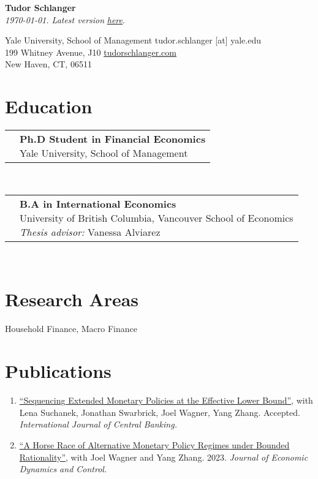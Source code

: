 \documentclass[letterpaper,10pt]{article}
\newcommand{\educItem}[4]{
		\vspace{0.2em} 	\begin{tabular*}{0.99\textwidth}[t]{lp{\labelsep}}
	      \eqparbox[t]{dates}{\ \ \ \ #1 \ \ \ \ } & \eqparbox[t]{educList}{\textbf{#2} \\ #3 \\ #4}
	   \end{tabular*} \vspace{0.2em} \\
		}
\newcommand{\pubSubHeadingListStart}{\begin{enumerate}[leftmargin=1em]}
\newcommand{\pubSubHeadingListEnd}{\end{enumerate}\vspace{-5pt}}
\newcommand{\pubItem}[3]{
	  \item{
	    \href{#1}{``#2''}{, with #3 \vspace{-2pt}}
	  }
	}
\begin{document}

\begin{center}
    \textbf{\Large  Tudor Schlanger} \\
    \textit{\today. Latest version} \href{https://raw.githubusercontent.com/tudorschlanger/cv/main/cv.pdf}{\textit{here}}.
\end{center}

Yale University, School of Management \hfill tudor.schlanger [at] yale.edu\\
199 Whitney Avenue, J10  			  \hfill  \href{tudorschlanger.com}{tudorschlanger.com} \\
New Haven, CT, 06511				  \hfill  


\section{Education}
\educItem{2023-Present}{Ph.D Student in Financial Economics}{Yale University, School of Management}{} 
\educItem{2019}{B.A in International Economics}{University of British Columbia, Vancouver School of Economics}{\textit{Thesis advisor:} Vanessa Alviarez} 

\section{Research Areas}

\hspace{1em} Household Finance, Macro Finance



\section{Publications}

\pubSubHeadingListStart
	\pubItem{https://www.bankofcanada.ca/wp-content/uploads/2021/07/sdp2021-10.pdf}{Sequencing Extended Monetary Policies at the Effective Lower Bound}{Lena Suchanek, Jonathan Swarbrick, Joel Wagner, Yang Zhang. Accepted. \textit{International Journal of Central Banking.}}
	\pubItem{https://www.dropbox.com/scl/fi/j163cbxanc4ij4jcdauxt/draft_paper_20230724_prepublish.pdf?rlkey=zgvazmtdvw3xdgurn0ry6qykb&e=1&dl=0}{A Horse Race of Alternative Monetary Policy Regimes under Bounded Rationality}{Joel Wagner and Yang Zhang. 2023. \textit{Journal of Economic Dynamics and Control. }}
\pubSubHeadingListEnd
\end{document}
